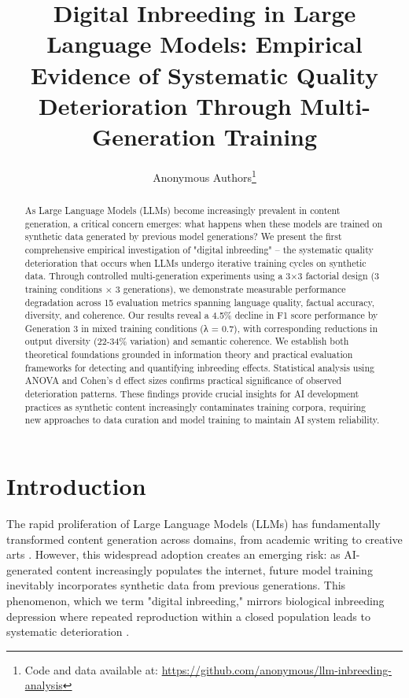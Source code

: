 \documentclass{article}
\title{Digital Inbreeding in Large Language Models: Empirical Evidence of Systematic Quality Deterioration Through Multi-Generation Training}
\author{
Anonymous Authors\thanks{Code and data available at: \url{https://github.com/anonymous/llm-inbreeding-analysis}}
}
\begin{document}
\maketitle

\begin{abstract}
As Large Language Models (LLMs) become increasingly prevalent in content generation, a critical concern emerges: what happens when these models are trained on synthetic data generated by previous model generations? We present the first comprehensive empirical investigation of "digital inbreeding" -- the systematic quality deterioration that occurs when LLMs undergo iterative training cycles on synthetic data. Through controlled multi-generation experiments using a 3×3 factorial design (3 training conditions × 3 generations), we demonstrate measurable performance degradation across 15 evaluation metrics spanning language quality, factual accuracy, diversity, and coherence. Our results reveal a 4.5\% decline in F1 score performance by Generation 3 in mixed training conditions (λ = 0.7), with corresponding reductions in output diversity (22-34\% variation) and semantic coherence. We establish both theoretical foundations grounded in information theory and practical evaluation frameworks for detecting and quantifying inbreeding effects. Statistical analysis using ANOVA and Cohen's d effect sizes confirms practical significance of observed deterioration patterns. These findings provide crucial insights for AI development practices as synthetic content increasingly contaminates training corpora, requiring new approaches to data curation and model training to maintain AI system reliability.
\end{abstract}

\section{Introduction}

The rapid proliferation of Large Language Models (LLMs) has fundamentally transformed content generation across domains, from academic writing to creative arts \citep{brown2020language,chowdhery2022palm,touvron2023llama}. However, this widespread adoption creates an emerging risk: as AI-generated content increasingly populates the internet, future model training inevitably incorporates synthetic data from previous generations. This phenomenon, which we term "digital inbreeding," mirrors biological inbreeding depression where repeated reproduction within a closed population leads to systematic deterioration \citep{charlesworth2009fundamental}.
\end{document}
